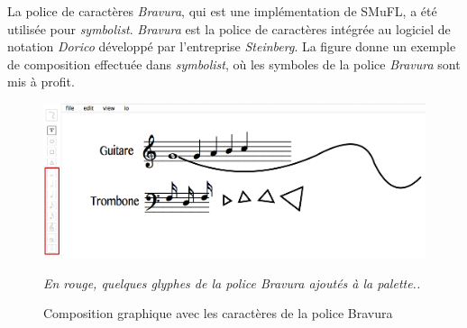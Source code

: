 La police de caractères \textit{Bravura}, qui est une implémentation de SMuFL, a été utilisée pour \textit{symbolist}. \textit{Bravura} est la police de caractères intégrée au logiciel de notation \textit{Dorico} développé par l'entreprise \textit{Steinberg}.
La figure donne un exemple de composition effectuée dans \textit{symbolist}, où les symboles de la police \textit{Bravura} sont mis à profit.

\begin{figure}[H]
	\centering
	\includegraphics[keepaspectratio=true, width=\textwidth]{ModeleDeNotation/i/bravuraCreation.png}
	\caption{Composition graphique avec les caractères de la police Bravura}
	\label{fig:bravuraCreation}
	\small
	\it
	En rouge, quelques glyphes de la police \emph{Bravura} ajoutés à la palette..
\end{figure}
     